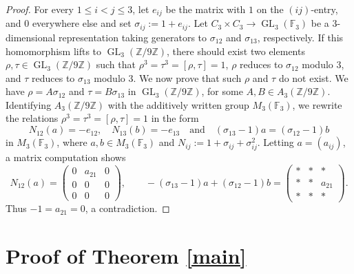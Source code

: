 \documentclass[12pt]{amsart}
\numberwithin{equation}{section}
\theoremstyle{definition}
\renewcommand{\(}{\bigl(}
\renewcommand{\)}{\bigr)}
\newcommand{\GL}{\operatorname{GL}}
\newcommand{\F}{\mathbb{F}}
\newcommand{\Z}{\mathbb{Z}}
\renewcommand{\leq}{\leqslant}
\begin{document}
\begin{proof}
For every $1 \leq i < j \leq 3$, let $e_{ij}$ be the matrix with
$1$ on the $(i j)$-entry, and $0$ everywhere else and set $\sigma_{ij}:=1+e_{ij}$.
Let $C_3 \times C_3\to \GL_3(\F_3)$ be a $3$-dimensional representation taking generators to $\sigma_{12}$ and $\sigma_{13}$,
respectively. If this homomorphism lifts to $\GL_3(\Z/9\Z)$,  there should exist two elements $\rho,\tau\in {\GL}_3(\Z/9\Z)$ such that $\rho^3=\tau^3=[\rho,\tau]=1$, $\rho$ reduces to $\sigma_{12}$ modulo $3$, and $\tau$ reduces to $\sigma_{13}$ modulo $3$. We now prove that such $\rho$ and $\tau$ do not exist. We have $\rho=A{\sigma}_{12}$ and
$\tau=B{\sigma}_{13}$ in $\GL_3(\Z/9\Z)$,
for some $A, B\in A_3(\Z/9\Z)$. Identifying  $A_3(\Z/9\Z)$ with the additively written group $M_3(\F_3)$,
we rewrite the relations $\rho^3=\tau^3=[\rho,\tau]=1$ in the form
\[
N_{12}(a) = -e_{12},\quad N_{13}(b) = -e_{13}\quad\text{and}\quad  (\sigma_{13}-1)a = (\sigma_{12} - 1)b
\]
in $M_3(\F_3)$, where $a,b\in M_3(\F_3)$ and
$N_{ij}:= 1+\sigma_{ij}+\sigma_{ij}^2$.
Letting $a=(a_{ij})$, a matrix computation shows
\[
N_{12}(a)=
\begin{pmatrix}
    0 & a_{21} & 0 \\
    0 & 0 & 0 \\
    0 & 0 & 0
\end{pmatrix},\qquad
-(\sigma_{13}-1)a+(\sigma_{12}-1)b=\begin{pmatrix}
    * & * & * \\
    * & * & a_{21} \\
    * & * & *
\end{pmatrix}.
\]
Thus $-1=a_{21}=0$, a contradiction.
\end{proof}





\section{Proof of Theorem \ref{main}}
\end{document}
